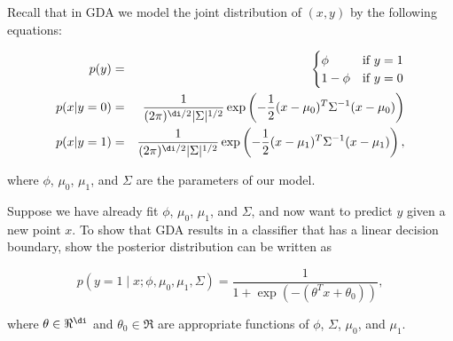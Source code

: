 \item {}
Recall that in GDA we model the joint distribution of $(x, y)$ by the following
equations:

\begin{eqnarray*}
	p(y) &=& \begin{cases}
	\phi & \mbox{if~} y = 1 \\
	1 - \phi & \mbox{if~} y = 0 \end{cases} \\
	p(x \vert  y=0) &=& \frac{1}{(2\pi)^{\di/2} \vert \Sigma\vert ^{1/2}}
		\exp\left(-\frac{1}{2}(x-\mu_{0})^T \Sigma^{-1} (x-\mu_{0})\right) \\
	p(x \vert  y=1) &=& \frac{1}{(2\pi)^{\di/2} \vert \Sigma\vert ^{1/2}}
		\exp\left(-\frac{1}{2}(x-\mu_1)^T \Sigma^{-1} (x-\mu_1) \right),
\end{eqnarray*}

where $\phi$, $\mu_0$, $\mu_1$, and $\Sigma$ are the parameters of our model.

Suppose we have already fit $\phi$, $\mu_0$, $\mu_1$, and $\Sigma$, and now
want to predict $y$ given a new point $x$. To show that GDA results in a
classifier that has a linear decision boundary, show the posterior distribution
can be written as

\begin{equation*}
	p(y = 1\mid x; \phi, \mu_0, \mu_1, \Sigma)
	= \frac{1}{1 + \exp(-(\theta^T x + \theta_0))},
\end{equation*}

where $\theta\in\Re^\di$ and $\theta_{0}\in\Re$ are appropriate functions of
$\phi$, $\Sigma$, $\mu_0$, and $\mu_1$.\\
